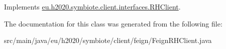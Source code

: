 Implements \hyperlink{interfaceeu_1_1h2020_1_1symbiote_1_1client_1_1interfaces_1_1RHClient_a4db8d3650014ed2c178e5be03da8ac63}{eu.\+h2020.\+symbiote.\+client.\+interfaces.\+R\+H\+Client}.



The documentation for this class was generated from the following file\+:\begin{DoxyCompactItemize}
\item 
src/main/java/eu/h2020/symbiote/client/feign/Feign\+R\+H\+Client.\+java\end{DoxyCompactItemize}
